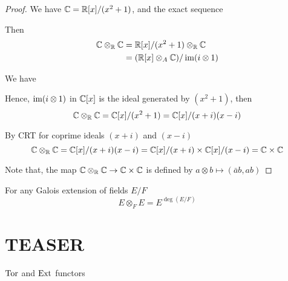 \begin{proof}
	We have $\mathbb{C} = \mathbb{R}[x] / (x^2 + 1)$, and the exact sequence 
	\begin{center}
	\end{center}
	
	Then 
	\begin{align*}
		\mathbb{C} \otimes_{\mathbb{R}} \mathbb{C}
		&= \mathbb{R}[x] / (x^2 + 1) \otimes_{\mathbb{R}} \mathbb{C} \\
		&= (\mathbb{R}[x] \otimes_A \mathbb{C}) / \operatorname{im} (i \otimes 1)
	\end{align*}
	
	We have
	\begin{center}
	\end{center}
	
	Hence, $\operatorname{im} (i \otimes 1)$ in $\mathbb{C}[x]$ is the ideal generated by $(x^2 + 1)$, then
	$$
		\mathbb{C} \otimes_{\mathbb{R}} \mathbb{C} = \mathbb{C}[x] / (x^2 + 1) = \mathbb{C}[x] / (x + i)(x - i)
	$$
	
	By CRT for coprime ideals $(x + i)$ and $(x - i)$
	$$
		\mathbb{C} \otimes_{\mathbb{R}} \mathbb{C}  = \mathbb{C}[x] / (x + i)(x - i) = \mathbb{C}[x] / (x + i) \times  \mathbb{C}[x] / (x - i) = \mathbb{C} \times \mathbb{C}
	$$
	
	Note that, the map $\mathbb{C} \otimes_{\mathbb{R}} \mathbb{C} \to \mathbb{C} \times \mathbb{C}$ is defined by $a \otimes b \mapsto (\bar{a} b, ab)$
\end{proof}

\begin{remark}
	For any Galois extension of fields $E / F$
	$$
		E \otimes_F E = E^{\deg(E / F)}
	$$
	
\end{remark}

\section{TEASER}

\begin{remark}
	$\operatorname{Tor}$ and $\operatorname{Ext}$ functors
\end{remark}

